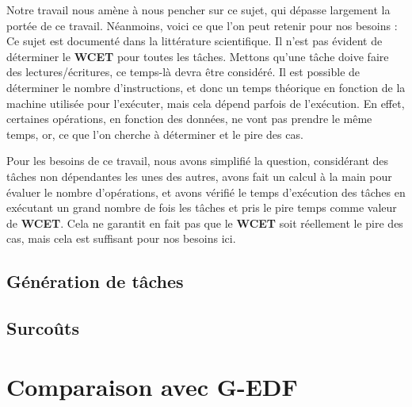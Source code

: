 Notre travail nous amène à nous pencher sur ce sujet, qui dépasse largement la portée de ce travail. 
Néanmoins, voici ce que l'on peut retenir pour nos besoins :\\
Ce sujet est documenté dans la littérature scientifique. Il n'est pas évident de déterminer le 
\textbf{WCET} pour toutes les tâches. Mettons qu'une tâche doive faire des lectures/écritures, 
ce temps-là devra être considéré. Il est possible de déterminer le nombre d'instructions, 
et donc un temps théorique en fonction de la machine utilisée pour l'exécuter, mais cela dépend 
parfois de l'exécution. En effet, certaines opérations, en fonction des données, ne vont pas prendre 
le même temps, or, ce que l'on cherche à déterminer et le pire des cas.\newline

Pour les besoins de ce travail, nous avons simplifié la question, considérant des tâches 
non dépendantes les unes des autres, avons fait un calcul à la main pour évaluer le 
nombre d'opérations, et avons vérifié le temps d'exécution des tâches en exécutant un grand nombre 
de fois les tâches et pris le pire temps comme valeur de \textbf{WCET}. Cela ne garantit en fait 
pas que le \textbf{WCET} soit réellement le pire des cas, mais cela est suffisant pour nos besoins ici.
\subsection{Génération de tâches}

\subsection{Surcoûts}

\section{Comparaison avec G-EDF}
